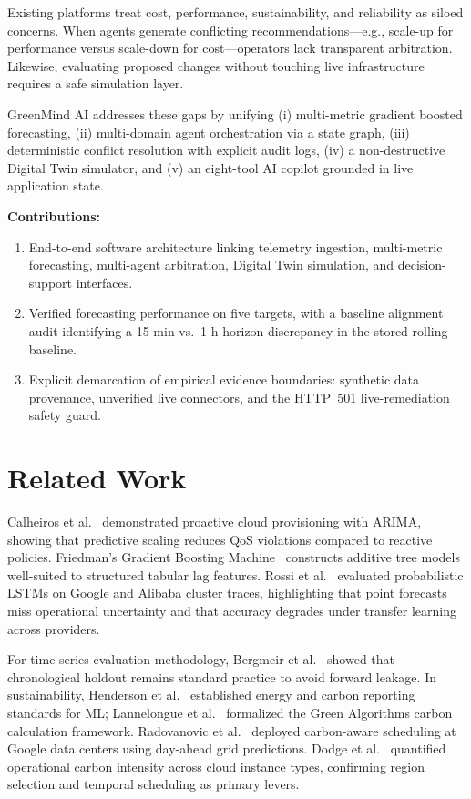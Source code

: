 \documentclass[conference]{IEEEtran}
\begin{document}
Existing platforms treat cost, performance, sustainability, and reliability
as siloed concerns. When agents generate conflicting recommendations---e.g.,
scale-up for performance versus scale-down for cost---operators lack
transparent arbitration. Likewise, evaluating proposed changes without
touching live infrastructure requires a safe simulation layer.

GreenMind AI addresses these gaps by unifying (i) multi-metric gradient
boosted forecasting, (ii) multi-domain agent orchestration via a state
graph, (iii) deterministic conflict resolution with explicit audit logs,
(iv) a non-destructive Digital Twin simulator, and (v) an eight-tool
AI copilot grounded in live application state.

\textbf{Contributions:}
\begin{enumerate}
  \item End-to-end software architecture linking telemetry ingestion,
        multi-metric forecasting, multi-agent arbitration, Digital Twin
        simulation, and decision-support interfaces.
  \item Verified forecasting performance on five targets, with a baseline
        alignment audit identifying a 15-min vs.\ 1-h horizon discrepancy
        in the stored rolling baseline.
  \item Explicit demarcation of empirical evidence boundaries: synthetic
        data provenance, unverified live connectors, and the HTTP~501
        live-remediation safety guard.
\end{enumerate}

\section{Related Work}
Calheiros et al.~\cite{r7} demonstrated proactive cloud provisioning with
ARIMA, showing that predictive scaling reduces QoS violations compared to
reactive policies. Friedman's Gradient Boosting Machine~\cite{r1} constructs
additive tree models well-suited to structured tabular lag features. Rossi
et al.~\cite{r3} evaluated probabilistic LSTMs on Google and Alibaba cluster
traces, highlighting that point forecasts miss operational uncertainty and
that accuracy degrades under transfer learning across providers.

For time-series evaluation methodology, Bergmeir et al.~\cite{r2} showed
that chronological holdout remains standard practice to avoid forward leakage.
In sustainability, Henderson et al.~\cite{r4} established energy and carbon
reporting standards for ML; Lannelongue et al.~\cite{r5} formalized the
Green Algorithms carbon calculation framework. Radovanovic et al.~\cite{r6}
deployed carbon-aware scheduling at Google data centers using day-ahead
grid predictions. Dodge et al.~\cite{r8} quantified operational carbon
intensity across cloud instance types, confirming region selection and
temporal scheduling as primary levers.
\end{document}
